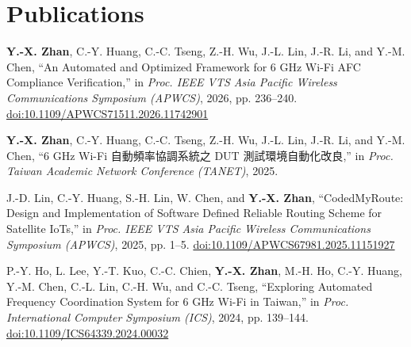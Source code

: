 \documentclass[10pt,a4paper]{article}
\begin{document}
\section{Publications}
\begin{enumerate}[label={[\arabic*]},leftmargin=18pt,itemsep=3pt]
\item \textbf{Y.-X. Zhan}, C.-Y. Huang, C.-C. Tseng, Z.-H. Wu, J.-L. Lin, J.-R. Li, and Y.-M. Chen,
  ``An Automated and Optimized Framework for 6 GHz Wi-Fi AFC Compliance Verification,''
  in \emph{Proc. IEEE VTS Asia Pacific Wireless Communications Symposium (APWCS)}, 2026, pp. 236--240.
  \href{https://doi.org/10.1109/APWCS71511.2026.11742901}{doi:10.1109/APWCS71511.2026.11742901}
\item \textbf{Y.-X. Zhan}, C.-Y. Huang, C.-C. Tseng, Z.-H. Wu, J.-L. Lin, J.-R. Li, and Y.-M. Chen,
  ``6 GHz Wi-Fi {\cjk 自動頻率協調系統之} DUT {\cjk 測試環境自動化改良},''
  in \emph{Proc. Taiwan Academic Network Conference (TANET)}, 2025.
\item J.-D. Lin, C.-Y. Huang, S.-H. Lin, W. Chen, and \textbf{Y.-X. Zhan},
  ``CodedMyRoute: Design and Implementation of Software Defined Reliable Routing Scheme for Satellite IoTs,''
  in \emph{Proc. IEEE VTS Asia Pacific Wireless Communications Symposium (APWCS)}, 2025, pp. 1--5.
  \href{https://doi.org/10.1109/APWCS67981.2025.11151927}{doi:10.1109/APWCS67981.2025.11151927}
\item P.-Y. Ho, L. Lee, Y.-T. Kuo, C.-C. Chien, \textbf{Y.-X. Zhan}, M.-H. Ho, C.-Y. Huang, Y.-M. Chen, C.-L. Lin, C.-H. Wu, and C.-C. Tseng,
  ``Exploring Automated Frequency Coordination System for 6 GHz Wi-Fi in Taiwan,''
  in \emph{Proc. International Computer Symposium (ICS)}, 2024, pp. 139--144.
  \href{https://doi.org/10.1109/ICS64339.2024.00032}{doi:10.1109/ICS64339.2024.00032}
\end{enumerate}
\end{document}
